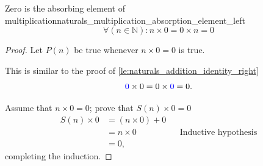 \begin{lemma}{Zero is the absorbing element of multiplication}{naturals_multiplication_absorption_element_left}
  \begin{equation*}
    \forall (n \in \mathbb{N}) : n \times 0 = 0 \times n = 0
  \end{equation*}
\end{lemma}
\begin{proof}
  Let \(P(n)\) be true whenever \(n \times 0 = 0\) is true.

  \basecase This is similar to the proof of \cref{le:naturals_addition_identity_right}
  \begin{equation}
    {\color{blue}0} \times 0 = 0 \times {\color{blue}0} = 0.
  \end{equation}

  \inductivestep Assume that \(n \times 0 = 0\); prove that \(S(n) \times 0 = 0\)
  \begin{align}
    S(n) \times 0 & = (n \times 0) + 0                                    \\
                  & = n \times 0       &  & \textrm{Inductive hypothesis} \\
                  & = 0,
  \end{align}
  completing the induction.
\end{proof}

